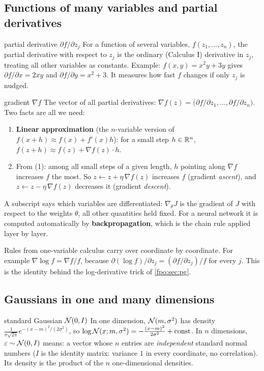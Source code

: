 \subsection{Functions of many variables and partial derivatives}
\begin{newc}{partial derivative $\partial f/\partial z_j$}
For a function of several variables, $f(z_1,\dots,z_n)$, the partial derivative with respect to $z_j$ is the ordinary (Calculus I) derivative in $z_j$, treating all other variables as constants. Example: $f(x,y)=x^2y+3y$ gives $\partial f/\partial x=2xy$ and $\partial f/\partial y=x^2+3$. It measures how fast $f$ changes if only $z_j$ is nudged.
\end{newc}
\begin{newc}{gradient $\nabla f$}
The vector of all partial derivatives: $\nabla f(z)=\big(\partial f/\partial z_1,\dots,\partial f/\partial z_n\big)$. Two facts are all we need:
\begin{enumerate}[leftmargin=*]
\item \textbf{Linear approximation} (the $n$-variable version of $f(x+h)\approx f(x)+f'(x)h$): for a small step $h\in\mathbb{R}^n$, $f(z+h)\approx f(z)+\nabla f(z)\cdot h$.
\item From (1): among all small steps of a given length, $h$ pointing along $\nabla f$ increases $f$ the most. So $z\leftarrow z+\eta\,\nabla f(z)$ increases $f$ (gradient \emph{ascent}), and $z\leftarrow z-\eta\,\nabla f(z)$ decreases it (gradient \emph{descent}).
\end{enumerate}
A subscript says which variables are differentiated: $\nabla_\theta J$ is the gradient of $J$ with respect to the weights $\theta$, all other quantities held fixed. For a neural network it is computed automatically by \textbf{backpropagation}, which is the chain rule applied layer by layer.
\end{newc}
Rules from one-variable calculus carry over coordinate by coordinate. For example $\nabla\log f=\nabla f/f$, because $\partial(\log f)/\partial z_j=(\partial f/\partial z_j)/f$ for every $j$. This is the identity behind the log-derivative trick of \cref{fpo:sec:pg}.

\subsection{Gaussians in one and many dimensions}
\begin{newc}{standard Gaussian $\mathcal{N}(0,I)$}
In one dimension, $\mathcal{N}(m,\sigma^2)$ has density $\frac{1}{\sigma\sqrt{2\pi}}e^{-(x-m)^2/(2\sigma^2)}$, so $\log\mathcal{N}(x;m,\sigma^2)=-\frac{(x-m)^2}{2\sigma^2}+\text{const}$. In $n$ dimensions, $\varepsilon\sim\mathcal{N}(0,I)$ means: a vector whose $n$ entries are \emph{independent} standard normal numbers ($I$ is the identity matrix: variance $1$ in every coordinate, no correlation). Its density is the product of the $n$ one-dimensional densities.
\end{newc}


